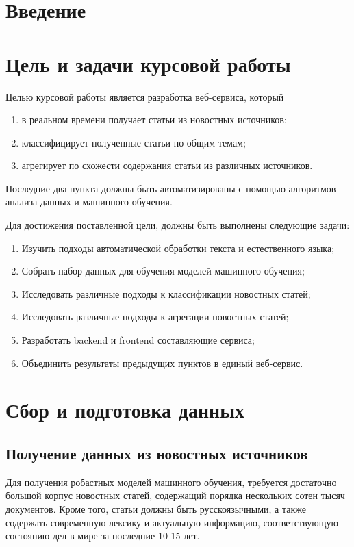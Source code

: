 \documentclass[a4paper, 14pt]{extarticle}
\begin{document}
\section{Введение}
\section{Цель и задачи курсовой работы}
Целью курсовой работы является разработка веб-сервиса, который
\begin{enumerate}
	\item в реальном времени получает статьи из новостных источников;
	\item классифицирует полученные статьи по общим темам;
	\item агрегирует по схожести содержания статьи из различных источников.
\end{enumerate}
Последние два пункта должны быть автоматизированы с помощью алгоритмов анализа данных и машинного обучения.

Для достижения поставленной цели, должны быть выполнены следующие задачи:
\begin{enumerate}
	\item Изучить подходы автоматической обработки текста и естественного языка;
	\item Собрать набор данных для обучения моделей машинного обучения;
	\item Исследовать различные подходы к классификации новостных статей;
	\item Исследовать различные подходы к агрегации новостных статей;
	\item Разработать backend и frontend составляющие сервиса;
	\item Объединить результаты предыдущих пунктов в единый веб-сервис.
\end{enumerate}
\section{Сбор и подготовка данных}
\subsection{Получение данных из новостных источников}
Для получения робастных моделей машинного обучения, требуется достаточно большой корпус новостных статей,
содержащий порядка нескольких сотен тысяч документов. Кроме того, статьи должны быть русскоязычными, а также
содержать современную лексику и актуальную информацию, соответствующую состоянию дел в мире за последние 10-15 лет.
\end{document}
